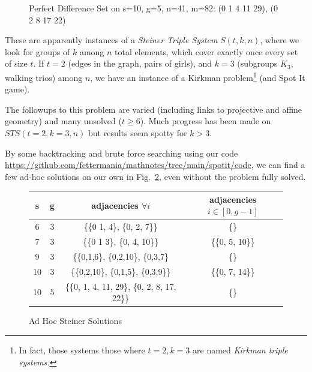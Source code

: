 \documentclass[11pt, oneside]{article} 	%
\begin{document}
\begin{figure}[!htb]
\caption{Perfect Difference Set on s=10, g=5, n=41, m=82: (0 1 4 11 29), (0 2 8 17 22)}
\label{fig:s10g5}
\end{figure}

These are apparently instances of a \emph{Steiner Triple System} $S(t, k, n)$\cite{6}, where we look for groups of $k$ among $n$ total elements, which cover exactly once every set of size $t$. If $t=2$ (edges in the graph, pairs of girls), and $k=3$ (subgroups $K_3$, walking trios) among $n$, we have an instance of a Kirkman problem\footnote{In fact, those systems those where $t=2, k=3$ are named \emph{Kirkman triple systems.}} (and Spot It game). 

The followups to this problem are varied (including links to projective and affine geometry) and many unsolved ($t \geq 6$). Much progress has been made on $STS(t=2,k=3,n)$ but results seem spotty for $k>3$.

By some backtracking and brute force searching using our code \url{https://github.com/fettermania/mathnotes/tree/main/spotit/code}, we can find a few ad-hoc solutions on our own in Fig.~\ref{fig:ad-hoc-steiner}, even without the problem fully solved.



\begin{figure}[!htb]
\centering
 \centering
 \begin{tabular}{c c | c | c }
 s & g & adjacencies $\forall i$ & adjacencies $i \in [0, g-1]$ \\
\hline
 6 & 3 & \{\{0 1, 4\}, \{0, 2, 7\}\} & \{\}\\
 7 & 3 & \{\{0 1 3\}, \{0, 4, 10\}\} & \{\{0, 5, 10\}\} \\
 9 & 3 & \{\{0,1,6\}, \{0,2,10\}, \{0,3,7\} & \{\} \\
 10 & 3 & \{\{0,2,10\}, \{0,1,5\}, \{0,3,9\}\} & \{\{0, 7, 14\}\} \\
 10 & 5 & \{\{0, 1, 4, 11, 29\}, \{0, 2, 8, 17, 22\}\} & \{\} \\
 \end{tabular}
 \caption{Ad Hoc Steiner Solutions }
\label{fig:ad-hoc-steiner}
\end{figure}
\end{document}
